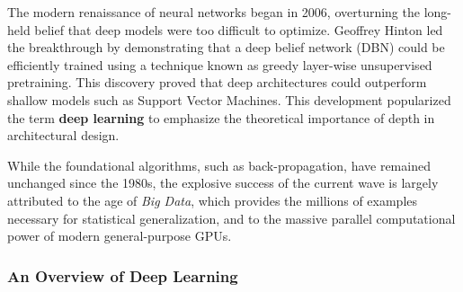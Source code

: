 \begin{enumerate}
	The modern renaissance of neural networks began in 2006, overturning the long-held belief that deep models were too difficult to optimize. Geoffrey Hinton led the breakthrough by demonstrating that a deep belief network (DBN) could be efficiently trained using a technique known as greedy layer-wise unsupervised pretraining.
	This discovery proved that deep architectures could outperform shallow models such as Support Vector Machines. This development popularized the term \textbf{deep learning} to emphasize the theoretical importance of depth in architectural design. 
	
	While the foundational algorithms, such as back-propagation, have remained unchanged since the 1980s, the explosive success of the current wave is largely attributed to the age of \textit{Big Data}, which provides the millions of examples necessary for statistical generalization, and to the massive parallel computational power of modern general-purpose GPUs.
\end{enumerate}

\subsubsection{An Overview of Deep Learning}

